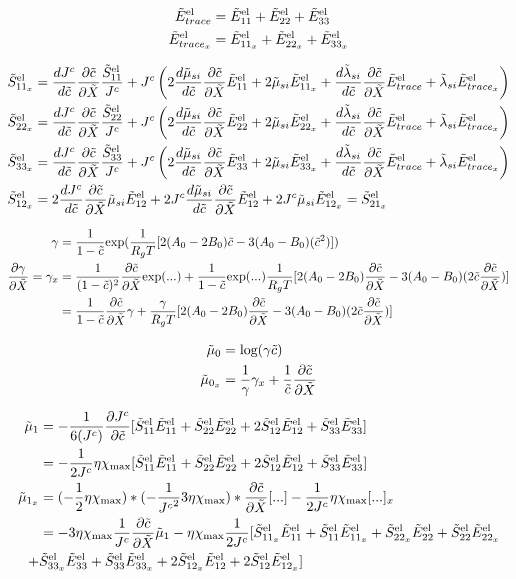 \documentclass[../main.tex]{subfiles}
\begin{document}
\begin{align}
    \tEel{trace} &= \tEel{11} + \tEel{22} + \tEel{33} \\
    \tEel{trace_x} &= \tEel{11_x} + \tEel{22_x} + \tEel{33_x} 
\end{align}

\begin{align}
    \tSel{11_x} &= \djc \tcx \fc{\tSel{11}}{\jc} + \jc \left(  2 \fc{d \td{\mu}_{si}}{d \td c} \tcx \tEel{11} + 2 \td{\mu}_{si} \tEel{11_x} + \fc{d \td {\lambda}_{si}}{d \td {c}} \tcx \tEel{trace} + \td{\lambda}_{si} \tEel{trace_x} \right) \\
    \tSel{22_x} &= \djc \tcx \fc{\tSel{22}}{\jc} + \jc \left(  2 \fc{d \td{\mu}_{si}}{d \td c} \tcx \tEel{22} + 2 \td{\mu}_{si} \tEel{22_x} + \fc{d \td {\lambda}_{si}}{d \td {c}} \tcx \tEel{trace} + \td{\lambda}_{si} \tEel{trace_x} \right) \\
    \tSel{33_x} &= \djc \tcx \fc{\tSel{33}}{\jc} + \jc \left(  2 \fc{d \td{\mu}_{si}}{d \td c} \tcx \tEel{33} + 2 \td{\mu}_{si} \tEel{33_x} + \fc{d \td {\lambda}_{si}}{d \td {c}} \tcx \tEel{trace} + \td{\lambda}_{si} \tEel{trace_x} \right) \\
    \tSel{12_x} &= 2 \djc \tcx \td{\mu}_{si}\tEel{12} + 2 \jc \fc{d\td{\mu}_{si}}{d \tc} \tcx \tEel{12} + 2 \jc \td{\mu}_{si}\tEel{12_x} = \tSel{21_x}
\end{align}

\begin{align}
    \gamma &= \fc{1}{1-\td{c}}\text{exp}(\fc{1}{R_g T}[2(A_0 - 2B_0)\td{c} - 3(A_0 - B_0)(\td{c}^2)])\\
    \pdiff{\gamma}{\tX} = \gamma_x &= \fc{1}{(1-\tc)^2} \tcx \text{exp}(...) + \fc{1}{1-\tc}\text{exp}(...)\fc{1}{R_g T}[2(A_0 - 2B_0)\tcx - 3(A_0 - B_0)(2\tc \tcx)] \\
    &= \fc{1}{1-\tc}\tcx \gamma + \fc{\gamma}{R_g T}[2(A_0 - 2B_0)\tcx - 3(A_0 - B_0)(2\tc \tcx)]\\
\end{align}

\begin{align}
    \td{\mu}_0 &= \text{log}(\gamma \td{c}) \\
    \td{\mu}_{0_x} &= \fc{1}{\gamma}\gamma_x + \fc{1}{\tc}\tcx
\end{align}


\begin{align}
     \td{\mu}_1 &= -\fc{1}{6(\jc)}\pdiff{ \jc}{\tc} [\tSel{11}\tEel{11} + \tSel{22}\tEel{22} + 2\tSel{12}\tEel{12} + \tSel{33}\tEel{33}] \\
    &= -\fc{1}{2\jc}\eta\xmax [\tSel{11}\tEel{11} + \tSel{22}\tEel{22} + 2\tSel{12}\tEel{12} + \tSel{33}\tEel{33}] \\
    \td{\mu}_{1_x} &= (-\fc{1}{2}\eta\xmax)*(-\fc{1}{\jc^2} 3 \eta \xmax)* \tcx [...] -\fc{1}{2\jc}\eta\xmax [...]_x\\
    &= -3\eta\xmax \fc{1}{\jc} \tcx \td{\mu}_{1} - \eta \xmax \fc{1}{2 \jc}[\tSel{11_x}\tEel{11} + \tSel{11}\tEel{11_x} + \tSel{22_x}\tEel{22} + \tSel{22}\tEel{22_x}  \\ +&\tSel{33_x}\tEel{33} + \tSel{33}\tEel{33_x} + 2\tSel{12_x}\tEel{12} + 2\tSel{12}\tEel{12_x}]
\end{align}
\end{document}

